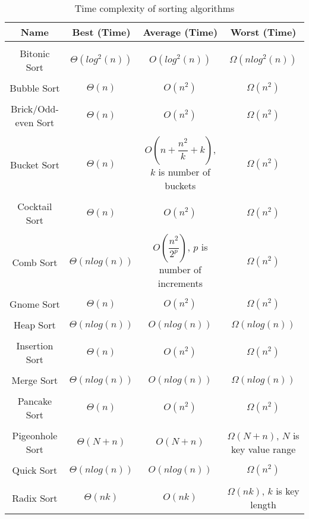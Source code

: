 \bigskip
\begin{table}[h!]
\centering
\begin{tabular}{||c c c c||} 
\hline
Name & Best (Time) & Average (Time) & Worst (Time) \\ [1ex] 
\hline\hline
 & & & \\
Bitonic Sort & \(\Theta(log^2(n))\) & \(O(log^2(n))\) & \(\Omega(nlog^2(n))\) \\ 
 & & & \\
Bubble Sort & \(\Theta(n)\) & \(O(n^2)\) & \(\Omega(n^2)\) \\ 
 & & & \\
Brick/Odd-even Sort & \(\Theta(n)\) & \(O(n^2)\) & \(\Omega(n^2)\) \\ 
 & & & \\
Bucket Sort & \(\Theta(n)\) & \(O(n+\dfrac{n^2}{k}+k)\), \(k\) is number of buckets & \(\Omega(n^2)\) \\ 
 & & & \\
Cocktail Sort & \(\Theta(n)\) & \(O(n^2)\) & \(\Omega(n^2)\) \\ 
 & & & \\
Comb Sort & \(\Theta(nlog(n))\) & \(O(\dfrac{n^2}{2^p})\), \(p\) is number of increments & \(\Omega(n^2)\) \\ 
 & & & \\
Gnome Sort & \(\Theta(n)\) & \(O(n^2)\) & \(\Omega(n^2)\) \\ 
 & & & \\
Heap Sort & \(\Theta(nlog(n))\) & \(O(nlog(n))\) & \(\Omega(nlog(n))\) \\ 
 & & & \\
Insertion Sort & \(\Theta(n)\) & \(O(n^2)\) & \(\Omega(n^2)\) \\ 
 & & & \\
Merge Sort & \(\Theta(nlog(n))\) & \(O(nlog(n))\) & \(\Omega(nlog(n))\) \\ 
 & & & \\
Pancake Sort & \(\Theta(n)\) & \(O(n^2)\) & \(\Omega(n^2)\) \\
 & & & \\
Pigeonhole Sort & \(\Theta(N+n)\) & \(O(N+n)\) & \(\Omega(N+n)\), \(N\) is key value range \\ 
 & & & \\
Quick Sort & \(\Theta(nlog(n))\) & \(O(nlog(n))\) & \(\Omega(n^2)\) \\ 
 & & & \\
Radix Sort & \(\Theta(nk)\) & \(O(nk)\) & \(\Omega(nk)\), \(k\) is key length \\  [1ex]
\hline
\end{tabular}
\caption{Time complexity of sorting algorithms}
\label{table:time_complexity_1}
\end{table}

